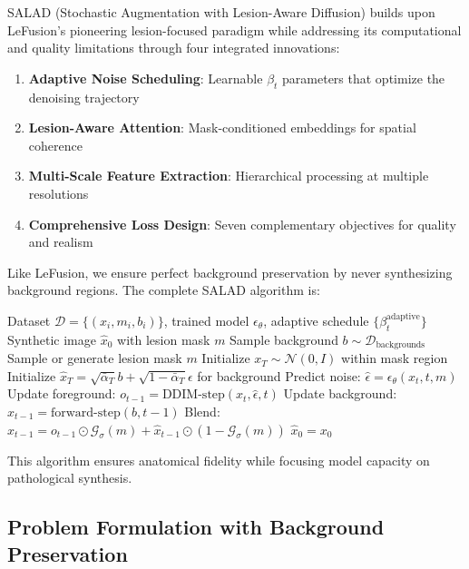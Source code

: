 \documentclass[10pt,twocolumn,letterpaper]{article}
\begin{document}
SALAD (Stochastic Augmentation with Lesion-Aware Diffusion) builds upon LeFusion's pioneering lesion-focused paradigm while addressing its computational and quality limitations through four integrated innovations:

\begin{enumerate}
    \item \textbf{Adaptive Noise Scheduling}: Learnable $\beta_t$ parameters that optimize the denoising trajectory
    \item \textbf{Lesion-Aware Attention}: Mask-conditioned embeddings for spatial coherence
    \item \textbf{Multi-Scale Feature Extraction}: Hierarchical processing at multiple resolutions
    \item \textbf{Comprehensive Loss Design}: Seven complementary objectives for quality and realism
\end{enumerate}

Like LeFusion, we ensure perfect background preservation by never synthesizing background regions. The complete SALAD algorithm is:

\begin{algorithm}[h]
\caption{SALAD: Stochastic Augmentation with Lesion-Aware Diffusion}
\label{alg:salad}
\begin{algorithmic}[1]
\REQUIRE Dataset $\mathcal{D} = \{(x_i, m_i, b_i)\}$, trained model $\epsilon_\theta$, adaptive schedule $\{\beta_t^{\text{adaptive}}\}$
\ENSURE Synthetic image $\hat{x}_0$ with lesion mask $m$
\STATE Sample background $b \sim \mathcal{D}_{\text{backgrounds}}$
\STATE Sample or generate lesion mask $m$
\STATE Initialize $x_T \sim \mathcal{N}(0, I)$ within mask region
\STATE Initialize $\hat{x}_T = \sqrt{\bar{\alpha}_T} b + \sqrt{1-\bar{\alpha}_T} \epsilon$ for background
    \STATE Predict noise: $\hat{\epsilon} = \epsilon_\theta(x_t, t, m)$
    \STATE Update foreground: $o_{t-1} = \text{DDIM-step}(x_t, \hat{\epsilon}, t)$
    \STATE Update background: $\hat{x}_{t-1} = \text{forward-step}(b, t-1)$
    \STATE Blend: $x_{t-1} = o_{t-1} \odot \mathcal{G}_\sigma(m) + \hat{x}_{t-1} \odot (1-\mathcal{G}_\sigma(m))$
\ENDFOR
\RETURN $\hat{x}_0 = x_0$
\end{algorithmic}
\end{algorithm}

This algorithm ensures anatomical fidelity while focusing model capacity on pathological synthesis.

\subsection{Problem Formulation with Background Preservation}
\end{document}
